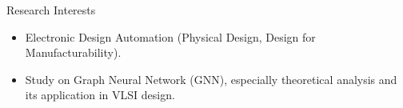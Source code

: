 
\begin{rSection}{Research Interests}
    
\begin{itemize}
    \item Electronic Design Automation (Physical Design, Design for Manufacturability).
    \item Study on Graph Neural Network (GNN), especially theoretical analysis and its application in VLSI design.
\end{itemize}
\end{rSection}




